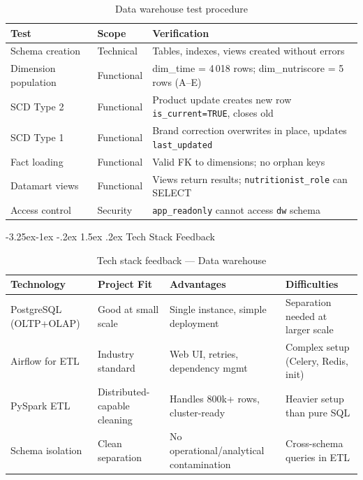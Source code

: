 \documentclass[a4paper,11pt,oneside,openany]{report}
\makeatletter
\renewcommand\subsection{\@startsection{subsection}{2}{\z@}%
  {-3.25ex\@plus -1ex \@minus -.2ex}%
  {1.5ex \@plus .2ex}%
  {\normalfont\large\bfseries\color{ntdarkgreen}}}
\makeatother
\begin{document}
\begin{table}[H]
\centering
\caption{Data warehouse test procedure}
\label{tab:test-dw}
\begin{tabularx}{\textwidth}{L{3cm} L{2cm} L{7.5cm}}
\toprule
\textbf{Test} & \textbf{Scope} & \textbf{Verification} \\
\midrule
Schema creation & Technical & Tables, indexes, views created without errors \\
Dimension population & Functional & dim\_time = 4\,018 rows; dim\_nutriscore = 5 rows (A--E) \\
SCD Type 2 & Functional & Product update creates new row \texttt{is\_current=TRUE}, closes old \\
SCD Type 1 & Functional & Brand correction overwrites in place, updates \texttt{last\_updated} \\
Fact loading & Functional & Valid FK to dimensions; no orphan keys \\
Datamart views & Functional & Views return results; \texttt{nutritionist\_role} can SELECT \\
Access control & Security & \texttt{app\_readonly} cannot access \texttt{dw} schema \\
\bottomrule
\end{tabularx}
\end{table}

\subsection{Tech Stack Feedback}

\begin{table}[H]
\centering
\caption{Tech stack feedback --- Data warehouse}
\label{tab:tech-feedback}
\begin{tabularx}{\textwidth}{L{2.8cm} L{3cm} L{3.5cm} L{3.5cm}}
\toprule
\textbf{Technology} & \textbf{Project Fit} & \textbf{Advantages} & \textbf{Difficulties} \\
\midrule
PostgreSQL (OLTP+OLAP) & Good at small scale & Single instance, simple deployment & Separation needed at larger scale \\
Airflow for ETL & Industry standard & Web UI, retries, dependency mgmt & Complex setup (Celery, Redis, init) \\
PySpark ETL & Distributed-capable cleaning & Handles 800k+ rows, cluster-ready & Heavier setup than pure SQL \\
Schema isolation & Clean separation & No operational/analytical contamination & Cross-schema queries in ETL \\
\bottomrule
\end{tabularx}
\end{table}
\end{document}

